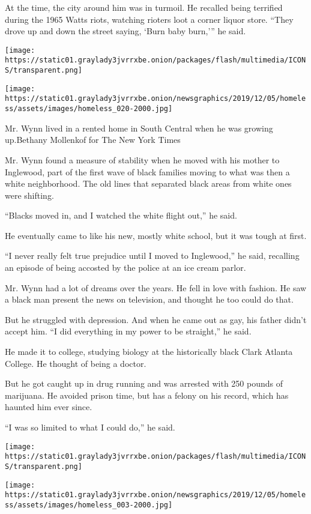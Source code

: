 At the time, the city around him was in turmoil. He recalled being
terrified during the 1965 Watts riots, watching rioters loot a corner
liquor store. ``They drove up and down the street saying, `Burn baby
burn,''' he said.

\texttt{[image: https://static01.graylady3jvrrxbe.onion/packages/flash/multimedia/ICONS/transparent.png]}

\texttt{[image: https://static01.graylady3jvrrxbe.onion/newsgraphics/2019/12/05/homeless/assets/images/homeless\_020-2000.jpg]}

Mr. Wynn lived in a rented home in South Central when he was growing
up.Bethany Mollenkof for The New York Times

Mr. Wynn found a measure of stability when he moved with his mother to
Inglewood, part of the first wave of black families moving to what was
then a white neighborhood. The old lines that separated black areas from
white ones were shifting.

``Blacks moved in, and I watched the white flight out,'' he said.

He eventually came to like his new, mostly white school, but it was
tough at first.

``I never really felt true prejudice until I moved to Inglewood,'' he
said, recalling an episode of being accosted by the police at an ice
cream parlor.

Mr. Wynn had a lot of dreams over the years. He fell in love with
fashion. He saw a black man present the news on television, and thought
he too could do that.

But he struggled with depression. And when he came out as gay, his
father didn't accept him. ``I did everything in my power to be
straight,'' he said.

He made it to college, studying biology at the historically black Clark
Atlanta College. He thought of being a doctor.

But he got caught up in drug running and was arrested with 250 pounds of
marijuana. He avoided prison time, but has a felony on his record, which
has haunted him ever since.

``I was so limited to what I could do,'' he said.

\texttt{[image: https://static01.graylady3jvrrxbe.onion/packages/flash/multimedia/ICONS/transparent.png]}

\texttt{[image: https://static01.graylady3jvrrxbe.onion/newsgraphics/2019/12/05/homeless/assets/images/homeless\_003-2000.jpg]}

